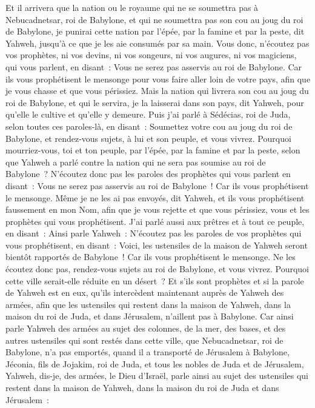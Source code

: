 \begin{multicols}{2}
Et il arrivera que la nation ou le royaume qui ne se soumettra pas à Nebucadnetsar, roi de Babylone, et qui ne soumettra pas son cou au joug du roi de Babylone, je punirai cette nation par l'épée, par la famine et par la peste, dit Yahweh, jusqu'à ce que je les aie consumés par sa main.
Vous donc, n'écoutez pas vos prophètes, ni vos devins, ni vos songeurs, ni vos augures, ni vos magiciens, qui vous parlent, en disant~: Vous ne serez pas asservis au roi de Babylone.
Car ils vous prophétisent le mensonge pour vous faire aller loin de votre pays, afin que je vous chasse et que vous périssiez.
Mais la nation qui livrera son cou au joug du roi de Babylone, et qui le servira, je la laisserai dans son pays, dit Yahweh, pour qu'elle le cultive et qu'elle y demeure.
Puis j'ai parlé à Sédécias, roi de Juda, selon toutes ces paroles-là, en disant~: Soumettez votre cou au joug du roi de Babylone, et rendez-vous sujets, à lui et son peuple, et vous vivrez.
Pourquoi mourriez-vous, toi et ton peuple, par l'épée, par la famine et par la peste, selon que Yahweh a parlé contre la nation qui ne sera pas soumise au roi de Babylone~?
N'écoutez donc pas les paroles des prophètes qui vous parlent en disant~: Vous ne serez pas asservis au roi de Babylone~! Car ils vous prophétisent le mensonge.
Même je ne les ai pas envoyés, dit Yahweh, et ils vous prophétisent faussement en mon Nom, afin que je vous rejette et que vous périssiez, vous et les prophètes qui vous prophétisent.
J'ai parlé aussi aux prêtres et à tout ce peuple, en disant~: Ainsi parle Yahweh~: N'écoutez pas les paroles de vos prophètes qui vous prophétisent, en disant~: Voici, les ustensiles de la maison de Yahweh seront bientôt rapportés de Babylone~! Car ils vous prophétisent le mensonge.
Ne les écoutez donc pas, rendez-vous sujets au roi de Babylone, et vous vivrez. Pourquoi cette ville serait-elle réduite en un désert~?
Et s'ils sont prophètes et si la parole de Yahweh est en eux, qu'ils intercèdent maintenant auprès de Yahweh des armées, afin que les ustensiles qui restent dans la maison de Yahweh, dans la maison du roi de Juda, et dans Jérusalem, n'aillent pas à Babylone.
Car ainsi parle Yahweh des armées au sujet des colonnes, de la mer, des bases, et des autres ustensiles qui sont restés dans cette ville,
que Nebucadnetsar, roi de Babylone, n'a pas emportés, quand il a transporté de Jérusalem à Babylone, Jéconia, fils de Jojakim, roi de Juda, et tous les nobles de Juda et de Jérusalem,
Yahweh, dis-je, des armées, le Dieu d'Israël, parle ainsi au sujet des ustensiles qui restent dans la maison de Yahweh, dans la maison du roi de Juda et dans Jérusalem~:

\end{multicols}
